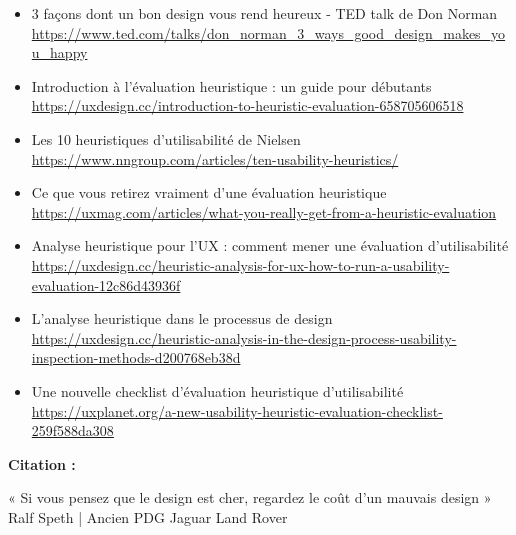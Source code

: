 \begin{itemize}
\item 3 façons dont un bon design vous rend heureux - TED talk de Don Norman \url{https://www.ted.com/talks/don_norman_3_ways_good_design_makes_you_happy}
\item Introduction à l'évaluation heuristique : un guide pour débutants \url{https://uxdesign.cc/introduction-to-heuristic-evaluation-658705606518}
\item Les 10 heuristiques d'utilisabilité de Nielsen \url{https://www.nngroup.com/articles/ten-usability-heuristics/}
\item Ce que vous retirez vraiment d'une évaluation heuristique \url{https://uxmag.com/articles/what-you-really-get-from-a-heuristic-evaluation}
\item Analyse heuristique pour l'UX : comment mener une évaluation d'utilisabilité \url{https://uxdesign.cc/heuristic-analysis-for-ux-how-to-run-a-usability-evaluation-12c86d43936f}
\item L'analyse heuristique dans le processus de design \url{https://uxdesign.cc/heuristic-analysis-in-the-design-process-usability-inspection-methods-d200768eb38d}
\item Une nouvelle checklist d'évaluation heuristique d'utilisabilité \url{https://uxplanet.org/a-new-usability-heuristic-evaluation-checklist-259f588da308}
\end{itemize}

\textbf{Citation :}

« Si vous pensez que le design est cher, regardez le coût d'un mauvais design » Ralf Speth | Ancien PDG Jaguar Land Rover

